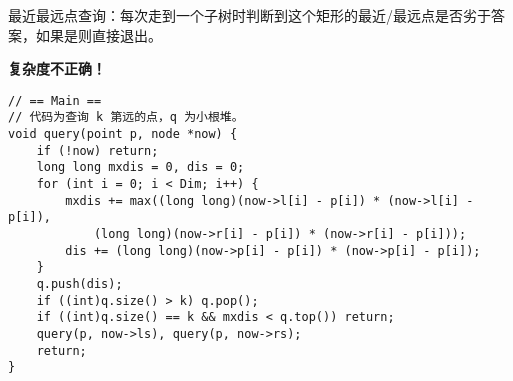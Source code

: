 最近最远点查询：每次走到一个子树时判断到这个矩形的最近/最远点是否劣于答案，如果是则直接退出。

\textbf{复杂度不正确！}

\begin{verbatim}
// == Main ==
// 代码为查询 k 第远的点，q 为小根堆。
void query(point p, node *now) {
    if (!now) return;
    long long mxdis = 0, dis = 0;
    for (int i = 0; i < Dim; i++) {
        mxdis += max((long long)(now->l[i] - p[i]) * (now->l[i] - p[i]),
            (long long)(now->r[i] - p[i]) * (now->r[i] - p[i]));
        dis += (long long)(now->p[i] - p[i]) * (now->p[i] - p[i]);
    }
    q.push(dis);
    if ((int)q.size() > k) q.pop();
    if ((int)q.size() == k && mxdis < q.top()) return;
    query(p, now->ls), query(p, now->rs);
    return;
}
\end{verbatim}